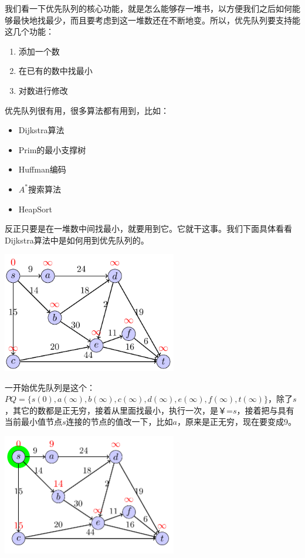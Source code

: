   	我们看一下优先队列的核心功能，就是怎么能够存一堆书，以方便我们之后如何能够最快地找最少，而且要考虑到这一堆数还在不断地变。所以，优先队列要支持能这几个功能：
  	\begin{enumerate}
  		\item
  		添加一个数
  		\item
  		在已有的数中找最小
  		\item
  		对数进行修改
  	\end{enumerate}
  	优先队列很有用，很多算法都有用到，比如：
  	\begin{itemize}
  		\item
  		Dijkstra算法
  		\item
  		Prim的最小支撑树
  		\item
  		Huffman编码
  		\item
  		$A^\ast$搜索算法
  		\item
  		HeapSort
  	\end{itemize}
  	反正只要是在一堆数中间找最小，就要用到它。它就干这事。我们下面具体看看Dijkstra算法中是如何用到优先队列的。\\
  	\begin{center}
  		\includegraphics[width=3in]{Dijkstra_demo.png}
  	\end{center}
  	一开始优先队列是这个：$PQ=\{s(0), a(\infty), b(\infty), c(\infty), d(\infty), e(\infty), f(\infty), t(\infty)\}$，除了$s$，其它的数都是正无穷，接着从里面找最小，执行一次，是￥=$s$，接着把与具有当前最小值节点$s$连接的节点的值改一下，比如$a$，原来是正无穷，现在要变成9。
  	\begin{center}
  		\includegraphics[width=3in]{Dijkstra_demo_1.png}
  	\end{center}
